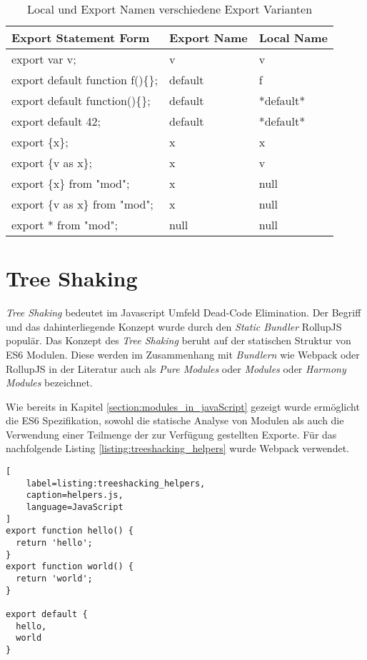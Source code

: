 \begin{table}[H]
\centering
\caption{Local und Export Namen verschiedene Export Varianten}
\label{tbl:local_export_names}
\begin{tabular}{|l|l|l|}
\hline
Export Statement Form            & Export Name & Local Name \\ \hline
export var v;                    & v           & v          \\ \hline
export default function f()\{\}; & default     & f          \\ \hline
export default function()\{\};   & default     & *default*  \\ \hline
export default 42;               & default     & *default*  \\ \hline
export \{x\};                    & x           & x          \\ \hline
export \{v as x\};               & x           & v          \\ \hline
export \{x\} from "mod";         & x           & null       \\ \hline
export \{v as x\} from "mod";    & x           & null       \\ \hline
export * from "mod";             & null        & null       \\ \hline
\end{tabular}
\end{table}

\section{Tree Shaking}

\textit{Tree Shaking} bedeutet im Javascript Umfeld Dead-Code Elimination. Der Begriff und das dahinterliegende Konzept wurde durch den \textit{Static Bundler} RollupJS populär. Das Konzept des \textit{Tree Shaking} beruht auf der statischen Struktur von ES6 Modulen. Diese werden im Zusammenhang mit \textit{Bundlern} wie Webpack oder RollupJS in der Literatur auch als \textit{Pure Modules} oder \textit{Modules} oder \textit{Harmony Modules} bezeichnet. \autocite{WebpackTreeShaking}

Wie bereits in Kapitel \ref{section:modules_in_javaScript} gezeigt wurde ermöglicht die ES6 Spezifikation, sowohl die statische Analyse von Modulen als auch die Verwendung einer Teilmenge der zur Verfügung gestellten Exporte.
Für das nachfolgende Listing \ref{listing:treeshacking_helpers} wurde Webpack verwendet.

\begin{lstlisting}[
    label=listing:treeshacking_helpers,
	caption=helpers.js,
	language=JavaScript
]
export function hello() {
  return 'hello';
}
export function world() {
  return 'world';
}

export default {
  hello,
  world
}
\end{lstlisting}

